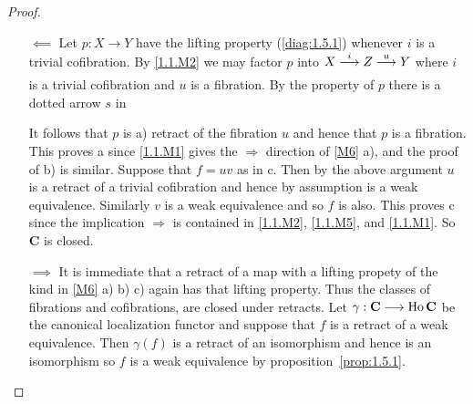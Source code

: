 \documentclass[../main]{subfiles}
\begin{document}
\begin{proof}\phantom{}
\begin{enumerate}
    \item[$\impliedby$]Let $p \colon X \longrightarrow Y$ have the lifting property (\ref{diag:1.5.1}) whenever $i$ is a trivial cofibration. By \ref{1.1.M2} we may factor $p$ into $X \varrightarrow{i} Z \varrightarrow{u} Y$ where $i$ is a trivial cofibration and $u$ is a fibration. By the property of $p$ there is a dotted arrow $s$ in 
\begin{center}
\end{center}
It follows that $p$ is a) retract of the fibration $u$ and hence that $p$ is a fibration. This proves a since \ref{1.1.M1} gives the $\Rightarrow$ direction of \ref{M6} a), and the proof of b) is similar. Suppose that $f = uv$ as in c. Then by the above argument $u$ is a retract of a trivial cofibration and hence by assumption is a weak equivalence. Similarly $v$ is a weak equivalence and so $f$ is also. This proves c since the implication $\Rightarrow$ is contained in \ref{1.1.M2}, \ref{1.1.M5}, and \ref{1.1.M1}. So $\mathbf C$ is closed.

    \item[$\implies$]It is immediate that a retract of a map with a lifting propety of the kind in \ref{M6} a) b) c) again has that lifting property. Thus the classes of fibrations and cofibrations, are closed under retracts. Let $\gamma : \mathbf C \longrightarrow \operatorname{Ho} \mathbf C$ be the canonical localization functor and suppose that $f$ is a retract of a weak equivalence. Then $\gamma(f)$ is a retract of an isomorphism and hence is an isomorphism so $f$ is a weak equivalence by proposition~\ref{prop:1.5.1}. 
\end{enumerate}
\end{proof} 
\end{document}
